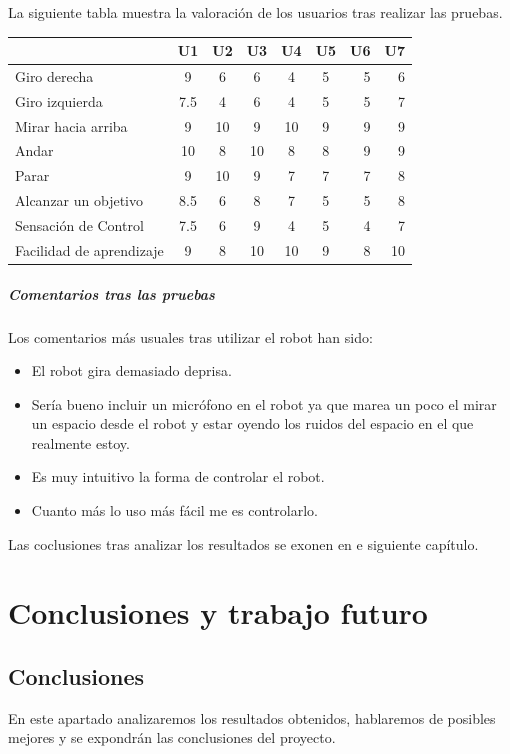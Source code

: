 \documentclass[twoside, 12pt]{epstfg}
\begin{document}
La siguiente tabla muestra la valoración de los usuarios tras realizar las pruebas.

\begin{tabular}{|l | c | c | c | c | c | r | r |}
	\hline
	 & U1 & U2 & U3 & U4 & U5 & U6 & U7\\
	\hline
	Giro derecha & 9 & 6 & 6 & 4 & 5 & 5 & 6\\
	Giro izquierda & 7.5 & 4 & 6 & 4 & 5 & 5 & 7\\
	Mirar hacia arriba & 9 & 10 & 9 & 10 & 9 & 9 & 9\\
	Andar & 10 & 8 & 10 & 8 & 8 & 9 & 9\\
	Parar & 9 & 10 & 9 & 7 & 7 & 7 & 8\\
	Alcanzar un objetivo & 8.5 & 6 & 8 & 7 & 5 & 5 & 8\\
	Sensación de Control & 7.5 & 6 & 9 & 4 & 5 & 4 & 7\\
	Facilidad de aprendizaje & 9 & 8 & 10 & 10 & 9 & 8 & 10\\
	\hline
\end{tabular}


\paragraph{Comentarios tras las pruebas}


Los comentarios más usuales tras utilizar el robot han sido:
\begin{itemize}
	\item El robot gira demasiado deprisa.
	\item Sería bueno incluir un micrófono en el robot ya que marea un poco el mirar un espacio desde el robot y estar oyendo los ruidos del espacio en el que realmente estoy.
	\item Es muy intuitivo la forma de controlar el robot.
	\item Cuanto más lo uso más fácil me es controlarlo.
\end{itemize}
 
Las coclusiones tras analizar los resultados se exonen en e siguiente capítulo.

\chapter{Conclusiones y trabajo futuro}
\label{chap:conclusiones}
\vspace{-0.2cm}

\section{Conclusiones}
En este apartado analizaremos los resultados obtenidos, hablaremos de posibles mejores y se expondrán las conclusiones del proyecto.
\end{document}
